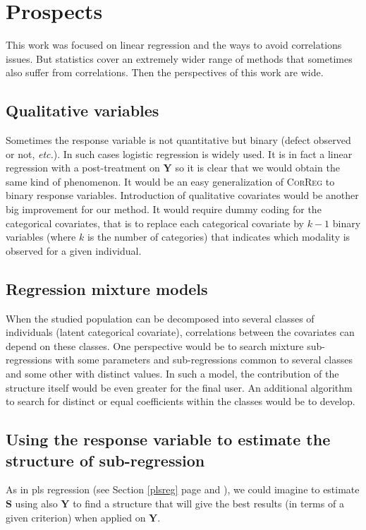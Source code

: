 \documentclass[12pt,a4paper]{report}
\begin{document}
	\section{Prospects}
	This work was focused on linear regression and the ways to avoid correlations issues. But statistics cover an extremely wider range of methods that sometimes also suffer from correlations. Then the perspectives of this work are wide.
		\subsection{Qualitative variables}
			Sometimes the response variable is not quantitative but binary (defect observed or not, {\it etc.}). In such cases logistic regression is widely used.
			It is \cite{hosmer2000applied} in fact a linear regression with a post-treatment on $\boldsymbol{Y}$ so it is clear that we would obtain the same kind of phenomenon. It would be an easy generalization of \textsc{CorReg} to binary response variables. Introduction of qualitative covariates would be another big improvement for our method. It would require dummy coding for the categorical covariates, that is to replace each categorical covariate by $k-1$ binary variables (where $k$ is the number of categories) that indicates which modality is observed for a given individual.
			
			\subsection{Regression mixture models}
			When the studied population can be decomposed into several classes of individuals (latent categorical covariate), correlations between the covariates can depend on these classes. One perspective would be to search mixture sub-regressions \cite{de1989mixtures} with some parameters and sub-regressions common to several classes and some other with distinct values. In such a model, the contribution of the structure itself would be even greater for the final user. An additional algorithm to search for distinct or equal coefficients within the classes would be to develop.
			\subsection{Using the response variable to estimate the structure of sub-regression}
			As in {\sc pls} regression (see Section \ref{plsreg} page \pageref{plsreg} and \cite{abdi2003partial,geladi1986partial}), we could imagine to estimate $\boldsymbol{S}$ using also $\boldsymbol{Y}$ to find a structure that will give the best results (in terms of a given criterion) when applied on $\boldsymbol{Y}$.\\
			
\end{document}
